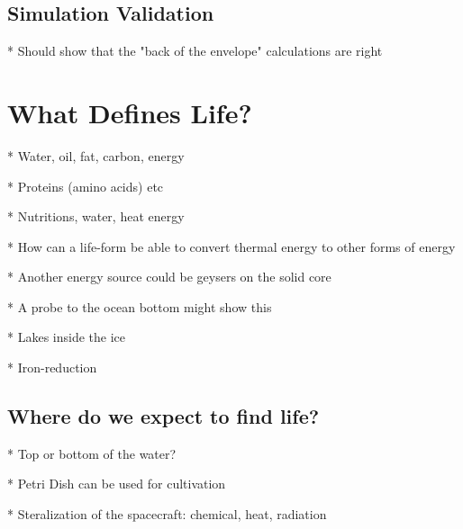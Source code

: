 \subsection{Simulation Validation}

* Should show that the "back of the envelope" calculations are right

\section{What Defines Life?} %

* Water, oil, fat, carbon, energy

* Proteins (amino acids) etc

* Nutritions, water, heat energy

* How can a life-form be able to convert thermal energy to other forms of energy

* Another energy source could be geysers on the solid core

    * A probe to the ocean bottom might show this
    
* Lakes inside the ice

* Iron-reduction

\subsection{Where do we expect to find life?}

* Top or bottom of the water?

* Petri Dish can be used for cultivation

* Steralization of the spacecraft: chemical, heat, radiation